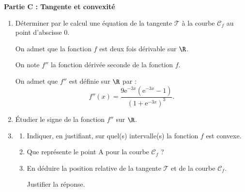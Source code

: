 \bigskip

\textbf{Partie C : Tangente et convexité}

\medskip

\begin{enumerate}
\item Déterminer par le calcul une équation de la tangente $\mathcal{T}$ à la courbe $\mathcal{C}_f$ au point d'abscisse $0$.

On admet que la fonction $f$ est deux fois dérivable sur $\R$. 

On note $f''$ la fonction dérivée seconde de la fonction $f$.

On admet que $f''$ est définie sur $\R$ par :
\[f''(x) = \dfrac{9\text{e}^{-3x} \left(\text{e}^{-3x} - 1\right)}{\left(1 + \text{e}^{-3x} \right)^3}.\]

\item Étudier le signe de la fonction $f''$ sur $\R$.
\item 
	\begin{enumerate}
		\item Indiquer, en justifiant, sur quel(s) intervalle(s) la fonction $f$ est convexe.
		\item Que représente le point A pour la courbe $\mathcal{C}_f$ ?
\item  En déduire la position relative de la tangente $\mathcal{T}$ et de la courbe $\mathcal{C}_f$.

Justifier la réponse.
	\end{enumerate}
\end{enumerate}

\medskip
